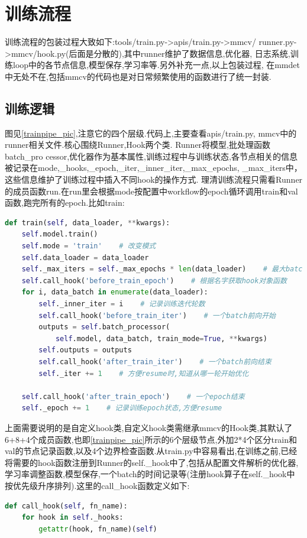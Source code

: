 \documentclass[UTF8]{ctexart}
\begin{document}
\section{训练流程}
训练流程的包装过程大致如下:tools/train.py->apis/train.py->mmcv/
runner.py->mmcv/hook.py(后面是分散的),其中runner维护了数据信息,优化器,
日志系统,训练loop中的各节点信息,模型保存,学习率等.另外补充一点,以上包装过程,
在mmdet中无处不在,包括mmcv的代码也是对日常频繁使用的函数进行了统一封装.

\label{trainpipeline}
\subsection{训练逻辑}
图见\ref{trainpipe_pic},注意它的四个层级.代码上,主要查看apis/train.py, mmcv中的runner相关文件.核心围绕Runner,Hook两个类.
Runner将模型,批处理函数batch\_pro
cessor,优化器作为基本属性,训练过程中与训练状态,各节点相关的信息
被记录在mode,\_hooks,\_epoch,\_iter,\_inner\_iter,\_max\_epochs,
\_max\_iters中，这些信息维护了训练过程中插入不同hook的操作方式.
理清训练流程只需看Runner的成员函数run.在run里会根据mode按配置中workflow的epoch循环调用train和val函数,跑完所有的epoch.比如train:
\lstset{style=mystyle}
\begin{lstlisting}[language=Python]
 def train(self, data_loader, **kwargs):
	self.model.train()
	self.mode = 'train'    # 改变模式
	self.data_loader = data_loader
	self._max_iters = self._max_epochs * len(data_loader)    # 最大batch循环次数
	self.call_hook('before_train_epoch')    # 根据名字获取hook对象函数
	for i, data_batch in enumerate(data_loader):
		self._inner_iter = i    # 记录训练迭代轮数
		self.call_hook('before_train_iter')    # 一个batch前向开始
		outputs = self.batch_processor(
			self.model, data_batch, train_mode=True, **kwargs)
		self.outputs = outputs
		self.call_hook('after_train_iter')    # 一个batch前向结束
		self._iter += 1    # 方便resume时,知道从哪一轮开始优化

	self.call_hook('after_train_epoch')    # 一个epoch结束
	self._epoch += 1    # 记录训练epoch状态,方便resume

\end{lstlisting}

上面需要说明的是自定义hook类,自定义hook类需继承mmcv的Hook类,其默认了6+8+4个成员函数,也即\ref{trainpipe_pic}所示的6个层级节点,外加2*4个区分train和val的节点记录函数,以及4个边界检查函数.从train.py中容易看出,在训练之前,已经将需要的hook函数注册到Runner的self.\_hook中了,包括从配置文件解析的优化器,学习率调整函数,模型保存,一个batch的时间记录等(注册hook算子在self.\_hook中按优先级升序排列).这里的call\_hook函数定义如下:
\lstset{style=mystyle}
\begin{lstlisting}[language=Python]
def call_hook(self, fn_name):
	for hook in self._hooks:
		getattr(hook, fn_name)(self)
\end{lstlisting}
\end{document}
